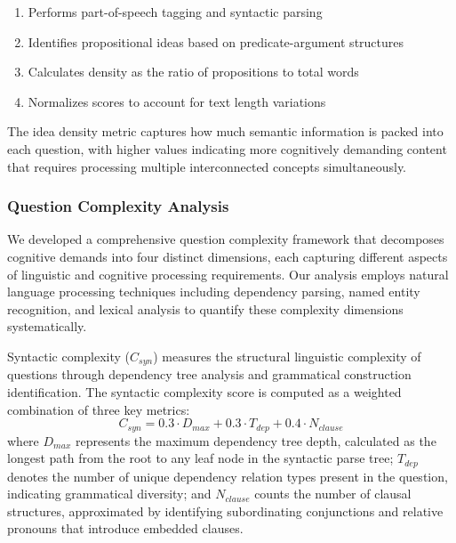\documentclass[12pt]{article}
\begin{document}
\begin{enumerate}
    \item Performs part-of-speech tagging and syntactic parsing
    \item Identifies propositional ideas based on predicate-argument structures
    \item Calculates density as the ratio of propositions to total words
    \item Normalizes scores to account for text length variations
\end{enumerate}

The idea density metric captures how much semantic information is packed into each question, with higher values indicating more cognitively demanding content that requires processing multiple interconnected concepts simultaneously.

\subsubsection{Question Complexity Analysis}

We developed a comprehensive question complexity framework that decomposes cognitive demands into four distinct dimensions, each capturing different aspects of linguistic and cognitive processing requirements. Our analysis employs natural language processing techniques including dependency parsing, named entity recognition, and lexical analysis to quantify these complexity dimensions systematically.

Syntactic complexity ($C_{syn}$) measures the structural linguistic complexity of questions through dependency tree analysis and grammatical construction identification. The syntactic complexity score is computed as a weighted combination of three key metrics:
\begin{equation}
C_{syn} = 0.3 \cdot D_{max} + 0.3 \cdot T_{dep} + 0.4 \cdot N_{clause}
\end{equation}
where $D_{max}$ represents the maximum dependency tree depth, calculated as the longest path from the root to any leaf node in the syntactic parse tree; $T_{dep}$ denotes the number of unique dependency relation types present in the question, indicating grammatical diversity; and $N_{clause}$ counts the number of clausal structures, approximated by identifying subordinating conjunctions and relative pronouns that introduce embedded clauses.
\end{document}
